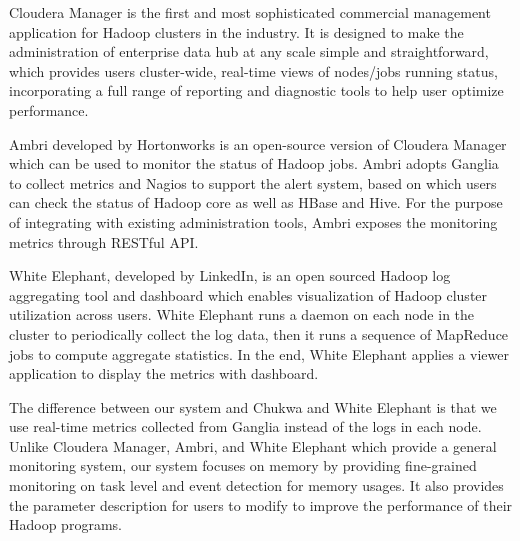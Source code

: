 Cloudera Manager\cite{http://www.cloudera.com} is the first and most sophisticated commercial management application for Hadoop clusters in the industry. 
It is designed to make the administration of enterprise data hub at any scale simple and straightforward, which provides users cluster-wide, real-time views of nodes/jobs running status, incorporating a full range of reporting and diagnostic tools to help user optimize performance.

Ambri\cite{http://hortonworks.com/hadoop/ambari} developed by Hortonworks is an open-source version of Cloudera Manager which can be used to monitor the status of Hadoop jobs.
Ambri adopts Ganglia to collect metrics and Nagios to support the alert system, based on which users can check the status of Hadoop core as well as HBase and Hive.
For the purpose of integrating with existing administration tools, Ambri exposes the monitoring metrics through RESTful API.
\par
White Elephant\cite{http://data.linkedin.com/opensource/white-elephant}, developed by LinkedIn, is an open sourced Hadoop log aggregating tool and dashboard which enables visualization of Hadoop cluster utilization across users. 
White Elephant runs a daemon on each node in the cluster to periodically collect the log data, then it runs a sequence of MapReduce jobs to compute aggregate statistics. In the end, White Elephant applies a viewer application to display the metrics with dashboard.
\par
The difference between our system and Chukwa and White Elephant is that we use real-time metrics collected from Ganglia instead of the logs in each node.
Unlike Cloudera Manager, Ambri, and White Elephant which provide a general monitoring system, our system focuses on memory by providing fine-grained monitoring on task level and event detection for memory usages. It also provides the parameter description for users to modify to improve the performance of their Hadoop programs.



